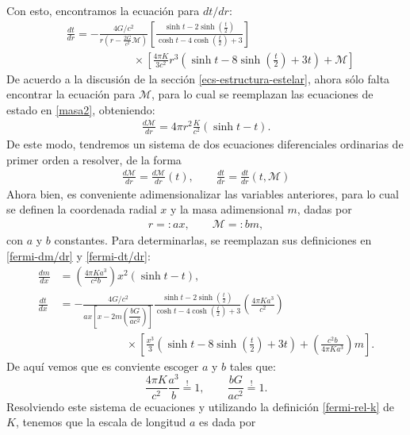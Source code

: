 Con esto, encontramos la ecuación para $dt/dr$:
\begin{align}
&\frac{dt}{dr}=-\frac{4G/c^2}{r\left(r-\frac{2G}{c^2}\mathcal{M}\right)}\left[\frac{\sinh t-2\sinh\left(\frac{t}{2}\right)}{\cosh t-4\cosh \left(\frac{t}{2}\right)+3}\right] \nonumber\\
& \qquad\qquad\qquad  \times \left[\frac{4\pi K}{3c^2} r^3\left(\sinh t-8\sinh \left(\frac{t}{2}\right)+3t\right)+\mathcal{M}\right]\label{fermi-dt/dr}
\end{align}
De acuerdo a la discusión de la sección \eqref{ecs-estructura-estelar}, ahora sólo falta encontrar la ecuación para $\mathcal{M}$, para lo cual se reemplazan las ecuaciones de estado en \eqref{masa2}, obteniendo:
\begin{align}
\frac{d\mathcal{M}}{dr}=4\pi r^2\frac{K}{c^2}(\sinh t-t)\label{fermi-dm/dr}.
\end{align}
De este modo, tendremos un sistema de dos ecuaciones diferenciales ordinarias de primer orden a resolver, de la forma
\begin{align}
 \frac{d\mathcal{M}}{dr}=\frac{d\mathcal{M}}{dr}(t),\qquad\frac{dt}{dr}=\frac{dt}{dr}(t,\mathcal{M})
\end{align}
Ahora bien, es conveniente adimensionalizar las variables anteriores, para lo cual se definen la coordenada radial $x$ y la masa adimensional $m$, dadas por
\begin{align}
 r=:ax,\qquad \mathcal{M}=:bm,
\end{align}
con $a$ y $b$ constantes. Para determinarlas, se reemplazan sus definiciones en \eqref{fermi-dm/dr} y \eqref{fermi-dt/dr}:
\begin{align}
 \frac{dm}{dx}&=\left(\frac{4\pi Ka^3}{c^2b}\right)x^2\left(\sinh t-t\right),\\
\frac{dt}{dx}&=-\frac{4G/c^2}{ax\left[x-2m\left(\dfrac{bG}{ac^2}\right)\right]}\frac{\sinh t-2\sinh\left(\frac{t}{2}\right)}{\cosh t-4\cosh \left(\frac{t}{2}\right)+3}\left(\frac{4\pi K a^3}{c^2}\right)\nonumber\\
&\qquad\qquad\qquad\times\left[ \frac{x^3}{3}\left(\sinh t-8\sinh \left(\frac{t}{2}\right)+3t\right)+\left(\frac{c^2b}{4\pi K a^3}\right)m\right].
\end{align}
De aquí vemos que es conviente escoger $a$ y $b$ tales que:
\begin{equation}\label{fermi-rel-sust-ayb}
\frac{4\pi K}{c^2}\frac{a^3}{b}\stackrel{!}{=}1,\qquad  \frac{bG}{ac^2}\stackrel{!}{=}1.
\end{equation}
Resolviendo este sistema de ecuaciones y utilizando la definición \eqref{fermi-rel-k} de $K$, tenemos que la escala de longitud $a$ es dada por
